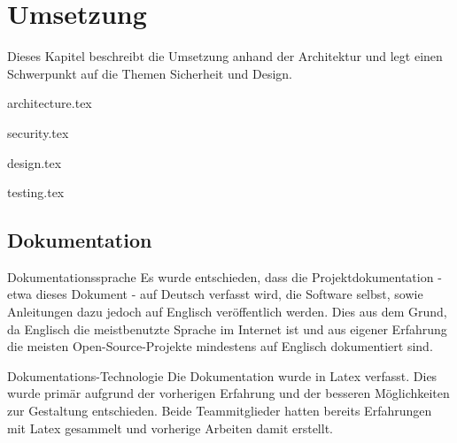\begin{comment}
(Implementierung) Architektur und Design beschrieben: Mit begründeten Architekturentscheidungen, mit Diskussion, wie Qualitätsattribute sichergestellt wurden (welche Qualität wurde erreicht?), mit Dokumentation, welche Experimente/Tests durchgeführt wurden und welche Lösungsoptionen aufgrund der Ergebnisse dieser Experimente/Tests
verworfen wurden (was ging schief?)
\end{comment}

\chapter{Umsetzung} \label{sec:implementation}

Dieses Kapitel beschreibt die Umsetzung anhand der Architektur und legt einen Schwerpunkt auf die Themen Sicherheit und Design.

{architecture.tex}

\clearpage
{security.tex}

\clearpage
{design.tex}

\clearpage
{testing.tex}

\section{Dokumentation} \label{sec:implementation:documentation}

\begin{decision}{Dokumentationssprache}
Es wurde entschieden, dass die Projektdokumentation - etwa dieses Dokument - auf Deutsch verfasst wird, die Software selbst, sowie Anleitungen dazu jedoch auf Englisch veröffentlich werden. Dies aus dem Grund, da Englisch die meistbenutzte Sprache im Internet ist \cite{websitelanguages} und aus eigener Erfahrung die meisten Open-Source-Projekte mindestens auf Englisch dokumentiert sind.
\end{decision}

\begin{decision}{Dokumentations-Technologie}
Die Dokumentation wurde in Latex verfasst. Dies wurde primär aufgrund der vorherigen Erfahrung und der besseren Möglichkeiten zur Gestaltung entschieden. Beide Teammitglieder hatten bereits Erfahrungen mit Latex gesammelt und vorherige Arbeiten damit erstellt.
\end{decision}